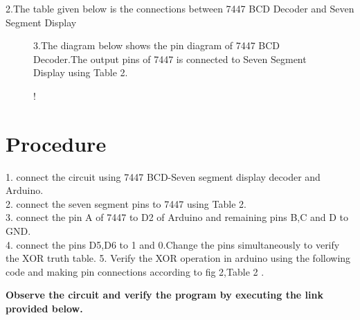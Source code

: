 \documentclass[journal,12pt,twocolumn]{IEEEtran}
\begin{document}
\begin{table}[!h]
2.The table given below is the connections between 7447 BCD Decoder and Seven Segment Display\\
\centering

\caption{}
\label{table:7447_disp}
\end{table}

\begin{figure}[!h]
3.The diagram below shows the pin diagram of 7447 BCD Decoder.The output pins of 7447 is connected to Seven Segment Display using Table 2.
\begin{center}
\resizebox {1.2\columnwidth} {!} {

}
\end{center}
\caption{}
\label{fig:7447}
\end{figure}

\section{Procedure}
1. connect the circuit using 7447 BCD-Seven segment display decoder and Arduino.\\
2. connect the seven segment pins to 7447 using Table 2.\\
3. connect the pin A of 7447 to D2 of Arduino and remaining pins B,C and D to GND. \\
4. connect the pins D5,D6 to 1 and 0.Change the pins simultaneously to verify the XOR truth table.
5. Verify the XOR operation in arduino using the following code and making
pin connections according to fig 2,Table 2 .

\textbf{Observe the circuit and verify the program by executing the link provided below.}\\
\begin{center}
\end{center}
\end{document}
